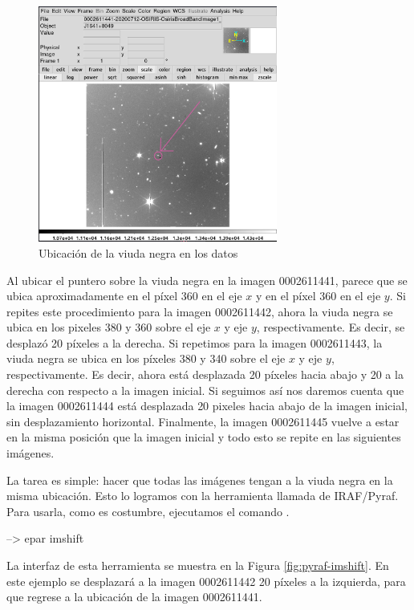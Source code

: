 \begin{figure}[htb]
  \centering
				\includegraphics[width=0.7\textwidth]{figures/ds9-viuda-negra.png}
				\caption{Ubicación de la viuda negra en los datos}
				\label{fig:ds9-viuda-negra} 
\end{figure}

Al ubicar el puntero sobre la viuda negra en la imagen 0002611441, parece que se ubica aproximadamente en el píxel 360 en el eje $ x $ y en el píxel 360 en el eje $ y $. Si repites este procedimiento para la imagen 0002611442, ahora la viuda negra se ubica en los pixeles 380 y 360 sobre el eje $ x $ y eje $ y $, respectivamente. Es decir, se desplazó 20 píxeles a la derecha. Si repetimos para la imagen 0002611443, la viuda negra se ubica en los píxeles 380 y 340 sobre el eje $ x $ y eje $ y $, respectivamente. Es decir, ahora está desplazada 20 píxeles hacia abajo y 20 a la derecha con respecto a la imagen inicial. Si seguimos así nos daremos cuenta que la imagen 0002611444 está desplazada 20 pixeles hacia abajo de la imagen inicial, sin desplazamiento horizontal. Finalmente, la imagen 0002611445 vuelve a estar en la misma posición que la imagen inicial y todo esto se repite en las siguientes imágenes.

La tarea es simple: hacer que todas las imágenes tengan a la viuda negra en la misma ubicación. Esto lo logramos con la herramienta llamada  de IRAF/Pyraf. Para usarla, como es costumbre, ejecutamos el comando .

\begin{shell}
--> epar imshift
\end{shell}
La interfaz de esta herramienta se muestra en la Figura \ref{fig:pyraf-imshift}. En este ejemplo se desplazará a la imagen 0002611442 20 píxeles a la izquierda, para que regrese a la ubicación de la imagen 0002611441. 

